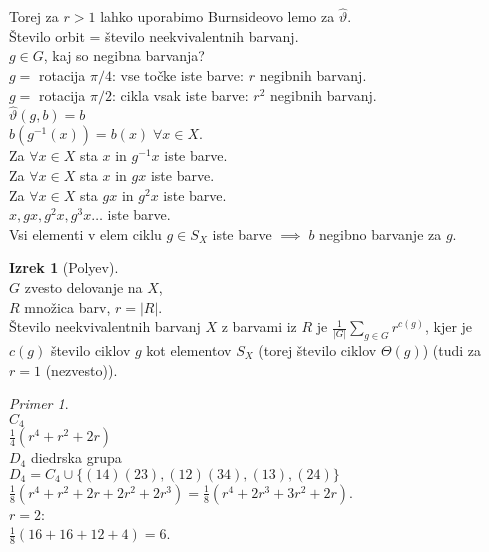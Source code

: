 \documentclass[a4paper, 12pt]{book}
\theoremstyle{definition}
\newtheorem{theorem}[counter]{Izrek}
\theoremstyle{remark}
\newtheorem*{ex}{Primer}
\begin{document}
Torej za $r > 1$ lahko uporabimo Burnsideovo lemo za $\widehat{\vartheta}$. \\
Število orbit = število neekvivalentnih barvanj. \\
$g \in G$, kaj so negibna barvanja? \\
$g =$ rotacija $\pi/4$: vse točke iste barve: $r$ negibnih barvanj. \\
$g =$ rotacija $\pi/2$: cikla vsak iste barve: $r^2$ negibnih barvanj. \\
$\widehat{\vartheta}(g, b) = b$ \\
$b(g^{-1}(x)) = b(x) \; \forall x \in X$. \\
Za $\forall x \in X$ sta $x$ in $g^{-1} x$ iste barve. \\
Za $\forall x \in X$ sta $x$ in $g x$ iste barve. \\
Za $\forall x \in X$ sta $g x$ in $g^{2} x$ iste barve. \\
$x, g x, g^2 x, g^3 x \dots$ iste barve. \\
Vsi elementi v elem ciklu $g \in S_X$ iste barve $\implies \; b$ negibno barvanje za $g$.
\begin{theorem}[Polyev] \text{} \\
  $G$ zvesto delovanje na $X$, \\
  $R$ množica barv, $r = |R|$. \\
  Število neekvivalentnih barvanj $X$ z barvami iz $R$ je $\frac{1}{|G|} \sum_{g \in G} r^{c(g)}$,
  kjer je $c(g)$ število ciklov $g$ kot elementov $S_X$ (torej število ciklov $\Theta(g)$)
  (tudi za $r=1$ (nezvesto)).
\end{theorem}
\begin{ex} \text{} \\
  $C_4$ \\
  $\frac{1}{4} \left(r^4 + r^2 + 2r\right)$ \\
  $D_4$ diedrska grupa \\
  $D_4 = C_4 \cup \{(1 4) (2 3), (1 2) (3 4), (1 3), (2 4)\}$ \\
  $\frac{1}{8} \left(r^4 + r^2 + 2r + 2r^2 + 2r^3\right) = \frac{1}{8} \left(r^4 + 2r^3 + 3r^2 + 2r\right)$. \\
  $r = 2$: \\
  $\frac{1}{8} (16 + 16 + 12 + 4) = 6$.
\end{ex}


\end{document}
